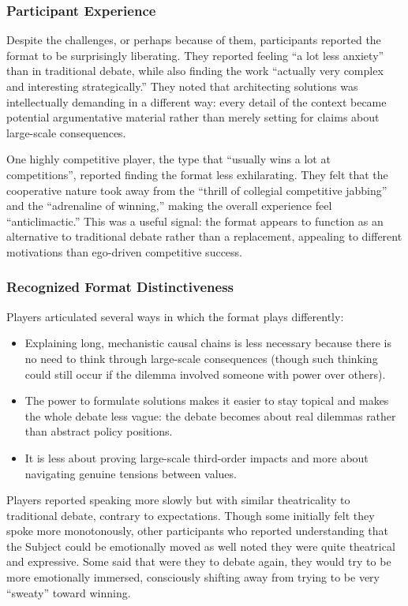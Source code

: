 \documentclass[12pt]{article}
\begin{document}
\subsubsection{Participant Experience}

Despite the challenges, or perhaps because of them, participants reported the format to be surprisingly liberating. They reported feeling ``a lot less anxiety'' than in traditional debate, while also finding the work ``actually very complex and interesting strategically.'' They noted that architecting solutions was intellectually demanding in a different way: every detail of the context became potential argumentative material rather than merely setting for claims about large-scale consequences.

One highly competitive player, the type that ``usually wins a lot at competitions'', reported finding the format less exhilarating. They felt that the cooperative nature took away from the ``thrill of collegial competitive jabbing'' and the ``adrenaline of winning,'' making the overall experience feel ``anticlimactic.'' This was a useful signal: the format appears to function as an alternative to traditional debate rather than a replacement, appealing to different motivations than ego-driven competitive success.

\subsubsection{Recognized Format Distinctiveness}

Players articulated several ways in which the format plays differently:

\begin{itemize}
    \item Explaining long, mechanistic causal chains is less necessary because there is no need to think through large-scale consequences (though such thinking could still occur if the dilemma involved someone with power over others).
    \item The power to formulate solutions makes it easier to stay topical and makes the whole debate less vague: the debate becomes about real dilemmas rather than abstract policy positions.
    \item It is less about proving large-scale third-order impacts and more about navigating genuine tensions between values.
\end{itemize}

Players reported speaking more slowly but with similar theatricality to traditional debate, contrary to expectations. Though some initially felt they spoke more monotonously, other participants who reported understanding that the Subject could be emotionally moved as well noted they were quite theatrical and expressive. Some said that were they to debate again, they would try to be more emotionally immersed, consciously shifting away from trying to be very ``sweaty'' toward winning.
\end{document}
